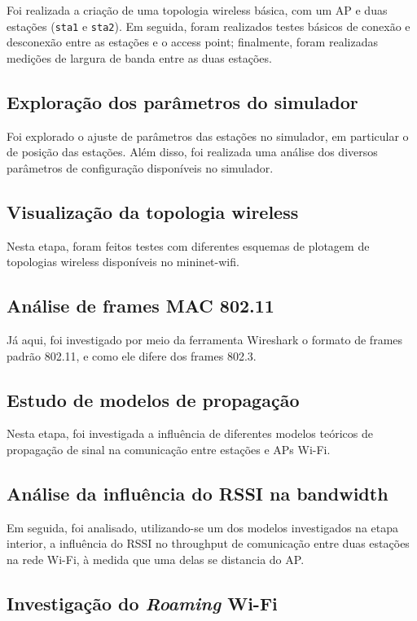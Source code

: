 \documentclass{article}
\begin{document}
Foi realizada a criação de uma topologia wireless básica, com um AP e duas estações
(\texttt{sta1} e \texttt{sta2}).
Em seguida, foram realizados testes básicos de conexão e desconexão entre as estações
e o access point; finalmente, foram realizadas medições de largura de banda entre as
duas estações.

\subsection{Exploração dos parâmetros do simulador}
Foi explorado o ajuste de parâmetros das estações no simulador, em particular o de
posição das estações. Além disso, foi realizada uma análise dos diversos parâmetros
de configuração disponíveis no simulador.


\subsection{Visualização da topologia wireless}

Nesta etapa, foram feitos testes com diferentes esquemas
de plotagem de topologias wireless disponíveis no mininet-wifi.


\subsection{Análise de frames MAC 802.11}

Já aqui, foi investigado por meio da ferramenta Wireshark
o formato de frames padrão 802.11, e como ele difere dos
frames 802.3.

\subsection{Estudo de modelos de propagação}

Nesta etapa, foi investigada a influência de diferentes
modelos teóricos de propagação de sinal na comunicação
entre estações e APs Wi-Fi.

\subsection{Análise da influência do RSSI na bandwidth}

Em seguida, foi analisado, utilizando-se um dos modelos
investigados na etapa interior, a influência do RSSI no
throughput de comunicação entre duas estações na rede Wi-Fi,
à medida que uma delas se distancia do AP.

\subsection{Investigação do \textit{Roaming} Wi-Fi}
\end{document}
